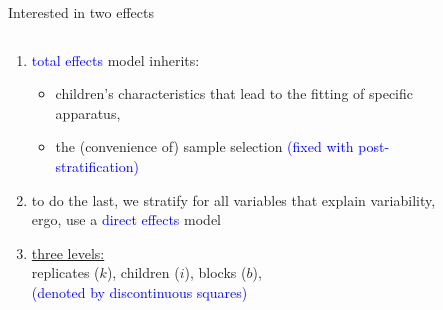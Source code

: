 \begin{frame}
	{Interested in two effects}
	\begin{columns}
		\begin{column}{0.5\textwidth}
			\begin{enumerate}
				\item \textcolor{blue}{total effects} model inherits:
				\begin{itemize}
					\item children’s characteristics that lead to the fitting of specific apparatus,
					\item the (convenience of) sample selection \textcolor{blue}{(fixed with post-stratification)}
				\end{itemize}
				\item to do the last, we stratify for all variables that explain variability, ergo, use a \textcolor{blue}{direct effects} model
				\item \underline{three levels:} \\
				replicates ($k$), children ($i$), blocks ($b$), \\
				{\small \textcolor{blue}{(denoted by discontinuous squares)}}
			\end{enumerate}
		\end{column}
		\begin{column}{0.5\textwidth}  
			\begin{figure}
\end{figure}
\end{column}
\end{columns}
\end{frame}
